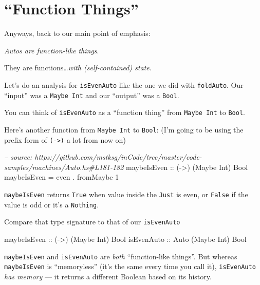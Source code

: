 \documentclass[]{article}
\newenvironment{Shaded}{}{}
\newcommand{\DataTypeTok}[1]{\textcolor[rgb]{0.56,0.13,0.00}{{#1}}}
\newcommand{\DecValTok}[1]{\textcolor[rgb]{0.25,0.63,0.44}{{#1}}}
\newcommand{\CommentTok}[1]{\textcolor[rgb]{0.38,0.63,0.69}{\textit{{#1}}}}
\newcommand{\OtherTok}[1]{\textcolor[rgb]{0.00,0.44,0.13}{{#1}}}
\newcommand{\FunctionTok}[1]{\textcolor[rgb]{0.02,0.16,0.49}{{#1}}}
\newcommand{\NormalTok}[1]{{#1}}
\begin{document}
\section{\texorpdfstring{``Function
Things''}{Function Things}}\label{function-things}

Anyways, back to our main point of emphasis:

\emph{Autos are function-like things}.

They are functions\ldots{}\emph{with (self-contained) state}.

Let's do an analysis for \texttt{isEvenAuto} like the one we did with
\texttt{foldAuto}. Our ``input'' was a \texttt{Maybe\ Int} and our
``output'' was a \texttt{Bool}.

You can think of \texttt{isEvenAuto} as a ``function thing'' from
\texttt{Maybe\ Int} to \texttt{Bool}.

Here's another function from \texttt{Maybe\ Int} to \texttt{Bool}: (I'm
going to be using the prefix form of \texttt{(-\textgreater{})} a lot
from now on)

\begin{Shaded}
\begin{Highlighting}[]
\CommentTok{-- source: https://github.com/mstksg/inCode/tree/master/code-samples/machines/Auto.hs#L181-182}
\OtherTok{maybeIsEven ::} \NormalTok{(}\OtherTok{->}\NormalTok{) (}\DataTypeTok{Maybe} \DataTypeTok{Int}\NormalTok{) }\DataTypeTok{Bool}
\NormalTok{maybeIsEven }\FunctionTok{=} \NormalTok{even }\FunctionTok{.} \NormalTok{fromMaybe }\DecValTok{1}
\end{Highlighting}
\end{Shaded}

\texttt{maybeIsEven} returns \texttt{True} when value inside the
\texttt{Just} is even, or \texttt{False} if the value is odd or it's a
\texttt{Nothing}.

Compare that type signature to that of our \texttt{isEvenAuto}

\begin{Shaded}
\begin{Highlighting}[]
\OtherTok{maybeIsEven ::} \NormalTok{(}\OtherTok{->}\NormalTok{) (}\DataTypeTok{Maybe} \DataTypeTok{Int}\NormalTok{) }\DataTypeTok{Bool}
\OtherTok{isEvenAuto  ::} \DataTypeTok{Auto} \NormalTok{(}\DataTypeTok{Maybe} \DataTypeTok{Int}\NormalTok{) }\DataTypeTok{Bool}
\end{Highlighting}
\end{Shaded}

\texttt{maybeIsEven} and \texttt{isEvenAuto} are \emph{both}
``function-like things''. But whereas \texttt{maybeIsEven} is
``memoryless'' (it's the same every time you call it),
\texttt{isEvenAuto} \emph{has memory} --- it returns a different Boolean
based on its history.
\end{document}
